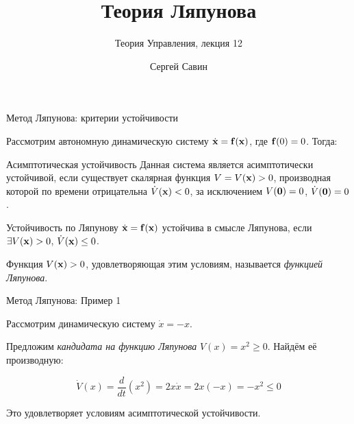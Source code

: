 \documentclass{beamer}
\title{Теория Ляпунова}
\subtitle{Теория Управления, лекция 12}
\author{Сергей Савин}
\date{\mydate}
\begin{document}
\maketitle


%
%




\begin{frame}{Метод Ляпунова: критерии устойчивости}
	\begin{flushleft}
		
		Рассмотрим автономную динамическую систему $\dot{\mathbf{x}} = \mathbf{f}(\mathbf{x})$, где $ \mathbf{f}(0) = 0$. Тогда:
		
		\begin{block}{Асимптотическая устойчивость}
			Данная система является асимптотически устойчивой, если существует скалярная функция $V = V(\mathbf{x}) > 0$, производная которой по времени отрицательна $\dot V(\mathbf{x}) < 0$, за исключением $V(\mathbf{0}) = 0$, $\dot V(\mathbf{0}) = 0$.
		\end{block}
		
		\begin{block}{Устойчивость по Ляпунову}
			$\dot{\mathbf{x}} = \mathbf{f}(\mathbf{x})$ устойчива в смысле Ляпунова, если $\exists V(\mathbf{x}) > 0$, $\dot V(\mathbf{x}) \leq 0$.
		\end{block}
		
		\begin{definition}
			Функция $V(\mathbf{x}) > 0$, удовлетворяющая этим условиям, называется \emph{функцией Ляпунова}.
		\end{definition}
		
	\end{flushleft}
\end{frame}

\begin{frame}{Метод Ляпунова: Пример 1}
	\begin{flushleft}
		
		Рассмотрим динамическую систему $\dot{x} = -x$. 
		
		\bigskip
		
		Предложим \emph{кандидата на функцию Ляпунова} $V(x) = x^2 \geq 0$. Найдём её производную:
		
		\begin{equation}
			\dot V(x) = 
			\frac{d}{dt}(  x^2  ) = 
			2x \dot x =
			2x (-x) =
			-x^2 \leq 0
		\end{equation}
		
		Это удовлетворяет условиям асимптотической устойчивости.
		
	\end{flushleft}
\end{frame}
\end{document}
